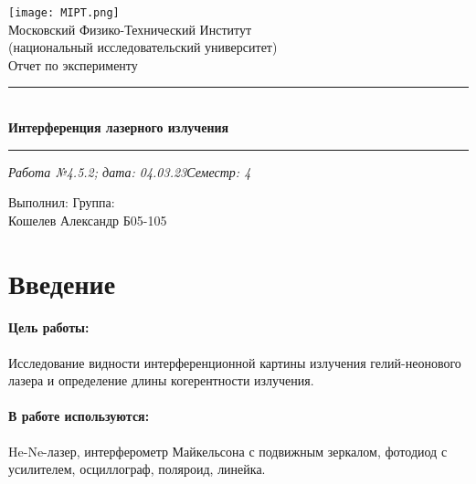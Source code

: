 \documentclass[12pt,a4paper]{article}
\begin{document}
	\begin{titlepage}
		\vspace*{\fill}
		
		\begin{center}
			\texttt{[image: MIPT.png]}
			\\[0.7cm]\Huge Московский Физико-Технический Институт\\(национальный исследовательский университет)
			\\[2cm]\LARGE Отчет по эксперименту
			\\[0.5cm]\noindent\rule{\textwidth}{1pt}
			\\\Huge\textbf{Интерференция лазерного излучения}
			\\[-0.5cm]\noindent\rule{\textwidth}{1pt}
		\end{center}
		
		\begin{flushleft}
			\textit{Работа №4.5.2; дата: 04.03.23}\hfill\textit{Семестр: 4}
		\end{flushleft}
		
		\vspace*{\fill}
		
		\begin{flushleft}
			Выполнил: \hspace{\fill} Группа:
			\\Кошелев Александр \hspace{\fill} Б05-105
		\end{flushleft}
	\end{titlepage}
	
	\setcounter{page}{2}
	
	\section{Введение}
	
	\paragraph*{Цель работы:} \hfill
	
	Исследование видности интерференционной картины излучения гелий-неонового лазера и определение длины когерентности излучения.

	\paragraph*{В работе используются:} \hfill
	
	He-Ne-лазер, интерферометр Майкельсона с подвижным зеркалом, фотодиод с усилителем, осциллограф, поляроид, линейка.
	
\end{document}
